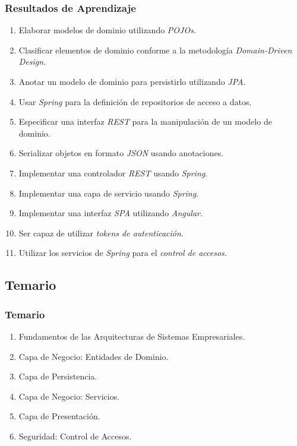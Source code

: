 \documentclass[a4paper,t,xcolor=pst,colortheme]{beamer}
\begin{document}
\begin{frame}[c]
   \frametitle{Resultados de Aprendizaje}
   \begin{enumerate}[<+->]
        \item Elaborar modelos de dominio utilizando \emph{POJOs}.
        \item Clasificar elementos de dominio conforme a la metodología \emph{Domain-Driven Design}.
        \item Anotar un modelo de dominio para persistirlo utilizando \emph{JPA}.
        \item Usar \emph{Spring} para la definición de repositorios de acceso a datos.
        \item Especificar una interfaz \emph{REST} para la manipulación de  un modelo de dominio.
        \item Serializar objetos en formato \emph{JSON} usando anotaciones.
        \item Implementar una controlador \emph{REST} usando \emph{Spring}.
        \item Implementar una capa de servicio usando \emph{Spring}.
        \item Implementar una interfaz \emph{SPA} utilizando \emph{Angular}.
        \item Ser capaz de utilizar \emph{tokens de autenticación}.
        \item Utilizar los servicios de \emph{Spring} para el \emph{control de accesos}.
	\end{enumerate}
\end{frame}

\subsection{Temario}

\begin{frame}[c]
	\frametitle{Temario}
	\begin{enumerate}
		\item<1-> Fundamentos de las Arquitecturas de Sistemas Empresariales.
		\item<2-> Capa de Negocio: Entidades de Dominio.
		\item<3-> Capa de Persistencia.
		\item<4-> Capa de Negocio: Servicios.
		\item<5-> Capa de Presentación.
        \item<6-> Seguridad: Control de Accesos.
	\end{enumerate}
\end{frame}
\end{document}
